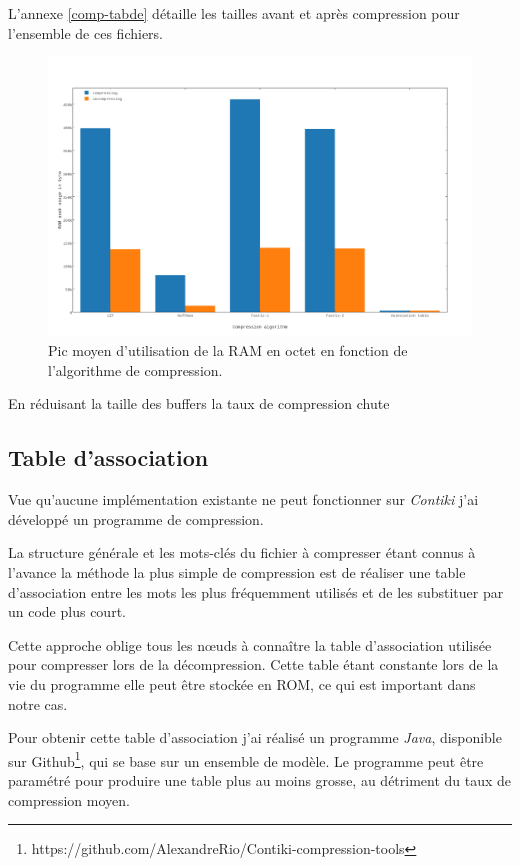 L'annexe \ref{comp-tabde} détaille les tailles avant et après compression pour l'ensemble de ces fichiers.

\begin{figure}[ht!]
\centering
\includegraphics[scale=0.4]{images/comp-memory.png}
\caption{Pic moyen d'utilisation de la RAM en octet en fonction de l'algorithme de compression.}
\end{figure}

En réduisant la taille des buffers la taux de compression chute

\subsection{Table d'association}

Vue qu'aucune implémentation existante ne peut fonctionner sur \emph{Contiki} j'ai développé un programme de compression.

La structure générale et les mots-clés du fichier à compresser étant connus à l'avance la méthode la plus simple de compression est de réaliser une table d'association entre les mots les plus fréquemment utilisés et de les substituer par un code plus court.

Cette approche oblige tous les nœuds à connaître la table d'association utilisée pour compresser lors de la décompression. Cette table étant constante lors de la vie du programme elle peut être stockée en ROM, ce qui est important dans notre cas.

Pour obtenir cette table d'association j'ai réalisé un programme \emph{Java}, disponible sur Github\footnote{https://github.com/AlexandreRio/Contiki-compression-tools}, qui se base sur un ensemble de modèle. Le programme peut être paramétré pour produire une table plus au moins grosse, au détriment du taux de compression moyen.

